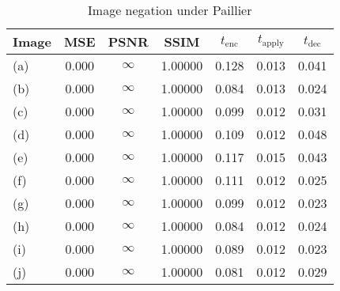 \begin{table}[h]
	\centering
	\caption{Image negation under Paillier}
	\label{tbl:neg-pal}
    \begin{tabular}{lcccccc}
        \toprule
        Image & MSE  & PSNR & SSIM & $t_\text{enc}$ & $t_\text{apply}$ & $t_\text{dec}$ \\ \midrule
        (a) & 0.000 & $\infty$ & 1.00000 & 0.128 & 0.013 & 0.041 \\
		(b) & 0.000 & $\infty$ & 1.00000 & 0.084 & 0.013 & 0.024 \\
		(c) & 0.000 & $\infty$ & 1.00000 & 0.099 & 0.012 & 0.031 \\
		(d) & 0.000 & $\infty$ & 1.00000 & 0.109 & 0.012 & 0.048 \\
		(e) & 0.000 & $\infty$ & 1.00000 & 0.117 & 0.015 & 0.043 \\
		(f) & 0.000 & $\infty$ & 1.00000 & 0.111 & 0.012 & 0.025 \\
		(g) & 0.000 & $\infty$ & 1.00000 & 0.099 & 0.012 & 0.023 \\
		(h) & 0.000 & $\infty$ & 1.00000 & 0.084 & 0.012 & 0.024 \\
		(i) & 0.000 & $\infty$ & 1.00000 & 0.089 & 0.012 & 0.023 \\
		(j) & 0.000 & $\infty$ & 1.00000 & 0.081 & 0.012 & 0.029 \\
		\bottomrule
    \end{tabular}
\end{table}
